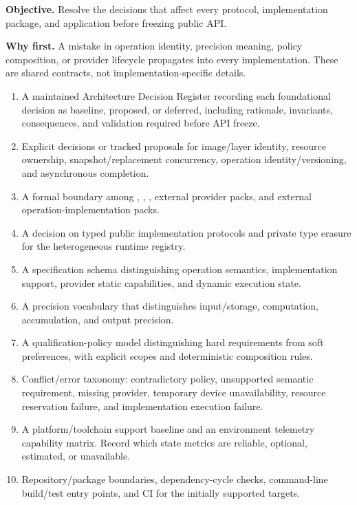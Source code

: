 
\textbf{Objective.} Resolve the decisions that affect every protocol, implementation package, and application before freezing public API.

\textbf{Why first.} A mistake in operation identity, precision meaning, policy composition, or provider lifecycle propagates into every implementation. These are shared contracts, not implementation-specific details.

\deliverables
\begin{enumerate}
  \item A maintained Architecture Decision Register recording each foundational decision as baseline, proposed, or deferred, including rationale, invariants, consequences, and validation required before API freeze.
  \item Explicit decisions or tracked proposals for image/layer identity, resource ownership, snapshot/replacement concurrency, operation identity/versioning, and asynchronous completion.
  \item A formal boundary among \IPP{}, \GEP{}, \IPR{}, external provider packs, and external operation-implementation packs.
  \item A decision on typed public implementation protocols and private type erasure for the heterogeneous runtime registry.
  \item A specification schema distinguishing operation semantics, implementation support, provider static capabilities, and dynamic execution state.
  \item A precision vocabulary that distinguishes input/storage, computation, accumulation, and output precision.
  \item A qualification-policy model distinguishing hard requirements from soft preferences, with explicit scopes and deterministic composition rules.
  \item Conflict/error taxonomy: contradictory policy, unsupported semantic requirement, missing provider, temporary device unavailability, resource reservation failure, and implementation execution failure.
  \item A platform/toolchain support baseline and an environment telemetry capability matrix. Record which state metrics are reliable, optional, estimated, or unavailable.
  \item Repository/package boundaries, dependency-cycle checks, command-line build/test entry points, and CI for the initially supported targets.
\end{enumerate}

